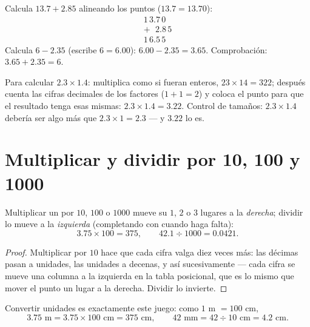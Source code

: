 \begin{example}\label{ex:g6:decimals:addsub}
Calcula $13.7 + 2.85$ alineando los puntos ($13.7 = 13.70$):
\[
\begin{array}{r}
1\,3.7\,0 \\
+\ \ \,2.8\,5 \\
\hline
1\,6.5\,5
\end{array}
\]
Calcula $6 - 2.35$ (escribe $6 = 6.00$):
$6.00 - 2.35 = 3.65$. Comprobación: $3.65 + 2.35 = 6$.
\end{example}

\begin{example}\label{ex:g6:decimals:mult}
Para calcular $2.3 \times 1.4$: multiplica como si fueran enteros,
$23 \times 14 = 322$; después cuenta las cifras decimales de los factores
($1 + 1 = 2$) y coloca el punto para que el resultado tenga esas mismas:
$2.3 \times 1.4 = 3.22$. Control de tamaños: $2.3 \times 1.4$
debería ser algo más que $2.3 \times 1 = 2.3$ --- y $3.22$ lo es.
\end{example}

\section{Multiplicar y dividir por 10, 100 y 1000}

\begin{proposition}\label{prop:g6:decimals:shift}
Multiplicar un  por $10$, $100$ o $1000$ mueve su  $1$, $2$ o $3$ lugares a la \emph{derecha}; dividir lo mueve a la
\emph{izquierda} (completando con  cuando haga falta):
\[
3.75 \times 100 = 375, \qquad
42.1 \div 1000 = 0.0421 .
\]
\end{proposition}

\begin{proof}
Multiplicar por $10$ hace que cada cifra valga diez veces más: las décimas
pasan a unidades, las unidades a decenas, y así sucesivamente --- cada cifra se mueve una
columna a la izquierda en la tabla posicional, que es lo mismo que mover
el punto un lugar a la derecha. Dividir lo invierte.
\end{proof}

\begin{example}\label{ex:g6:decimals:units}
Convertir unidades es exactamente este juego: como $1$ m $= 100$ cm,
\[
3.75 \text{ m} = 3.75 \times 100 \text{ cm} = 375 \text{ cm},
\qquad
42 \text{ mm} = 42 \div 10 \text{ cm} = 4.2 \text{ cm}.
\]
\end{example}

